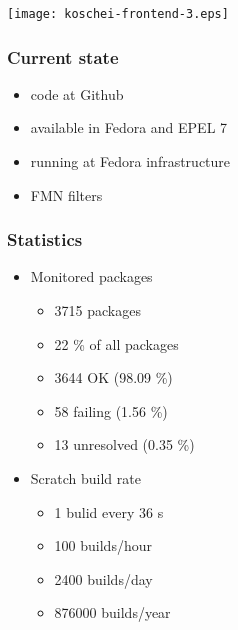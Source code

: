 \documentclass[pdftex,unicode,xcolor=table]{beamer}
\begin{document}
\begin{frame}[fragile]
  \begin{center}
    \texttt{[image: koschei-frontend-3.eps]}
  \end{center}
\end{frame}

\begin{frame}
  \frametitle{Current state}
  \begin{itemize}
    \item code at Github
    \item available in Fedora and EPEL 7
    \item running at Fedora infrastructure
    \item FMN filters
  \end{itemize}
\end{frame}

\begin{frame}
  \frametitle{Statistics}
  \begin{itemize}
    \item Monitored packages
    \begin{itemize}
      \item 3715 packages
      \item 22 \% of all packages
      \item 3644 OK (98.09 \%)
      \item 58 failing (1.56 \%)
      \item 13 unresolved (0.35 \%)
    \end{itemize}
    \item Scratch build rate
    \begin{itemize}
      \item 1 bulid every 36 s
      \item 100 builds/hour
      \item 2400 builds/day
      \item 876000 builds/year
    \end{itemize}
  \end{itemize}
\end{frame}
\end{document}
